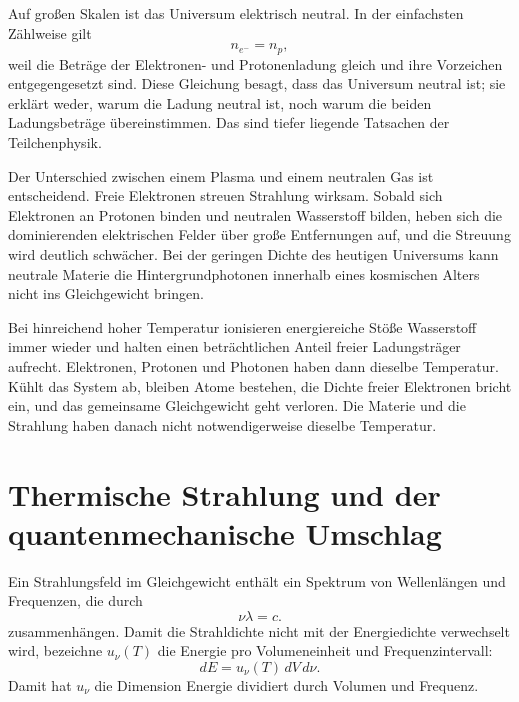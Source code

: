 Auf großen Skalen ist das Universum elektrisch neutral. In der einfachsten Zählweise gilt
\begin{equation}
n_{e^-}=n_p,
\label{eq:c07-neutrality}
\end{equation}
weil die Beträge der Elektronen- und Protonenladung gleich und ihre Vorzeichen entgegengesetzt sind. Diese Gleichung besagt, dass das Universum neutral ist; sie erklärt weder, warum die Ladung neutral ist, noch warum die beiden Ladungsbeträge übereinstimmen. Das sind tiefer liegende Tatsachen der Teilchenphysik.

Der Unterschied zwischen einem Plasma und einem neutralen Gas ist entscheidend. Freie Elektronen streuen Strahlung wirksam. Sobald sich Elektronen an Protonen binden und neutralen Wasserstoff bilden, heben sich die dominierenden elektrischen Felder über große Entfernungen auf, und die Streuung wird deutlich schwächer. Bei der geringen Dichte des heutigen Universums kann neutrale Materie die Hintergrundphotonen innerhalb eines kosmischen Alters nicht ins Gleichgewicht bringen.

Bei hinreichend hoher Temperatur ionisieren energiereiche Stöße Wasserstoff immer wieder und halten einen beträchtlichen Anteil freier Ladungsträger aufrecht. Elektronen, Protonen und Photonen haben dann dieselbe Temperatur. Kühlt das System ab, bleiben Atome bestehen, die Dichte freier Elektronen bricht ein, und das gemeinsame Gleichgewicht geht verloren. Die Materie und die Strahlung haben danach nicht notwendigerweise dieselbe Temperatur.

\begin{classroomqa}
\end{classroomqa}

\section{Thermische Strahlung und der quantenmechanische Umschlag}

Ein Strahlungsfeld im Gleichgewicht enthält ein Spektrum von Wellenlängen und Frequenzen, die durch
\begin{equation}
\nu\lambda=c.
\end{equation}
zusammenhängen. Damit die Strahldichte nicht mit der Energiedichte verwechselt wird, bezeichne \(u_\nu(T)\) die Energie pro Volumeneinheit und Frequenzintervall:
\begin{equation}
dE=u_\nu(T)\,dV\,d\nu.
\label{eq:c07-spectral-density}
\end{equation}
Damit hat \(u_\nu\) die Dimension Energie dividiert durch Volumen und Frequenz.

